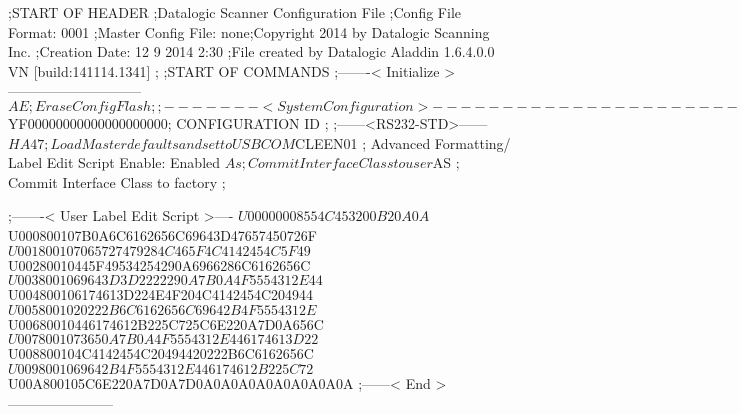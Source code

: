 ;START OF HEADER
;Datalogic Scanner Configuration File
;Config File Format: 0001
;Master Config File: none;Copyright 2014 by Datalogic Scanning Inc.
;Creation Date: 12 9 2014 2:30
;File created by Datalogic Aladdin 1.6.4.0.0 VN [build:141114.1341]
;
;START OF COMMANDS
;-------< Initialize >-----------------------------
$AE                 ; Erase Config Flash
;
;-------< System Configuration >-------------------------------
$YF00000000000000000000; CONFIGURATION ID
;
;------<RS232-STD>------
$HA47               ; Load Master defaults and set to USBCOM
$CLEEN01            ; Advanced Formatting/ Label Edit Script Enable: Enabled
$As                 ; Commit Interface Class to user
$AS                 ; Commit Interface Class to factory
;

;-------< User Label Edit Script >----
$U00000008554C453200B20A0A
$U000800107B0A6C6162656C69643D47657450726F
$U001800107065727479284C465F4C4142454C5F49
$U00280010445F49534254290A6966286C6162656C
$U0038001069643D3D2222290A7B0A4F5554312E44
$U004800106174613D224E4F204C4142454C204944
$U0058001020222B6C6162656C69642B4F5554312E
$U00680010446174612B225C725C6E220A7D0A656C
$U0078001073650A7B0A4F5554312E446174613D22
$U008800104C4142454C20494420222B6C6162656C
$U0098001069642B4F5554312E446174612B225C72
$U00A800105C6E220A7D0A7D0A0A0A0A0A0A0A0A0A
;------< End >-----------------------
